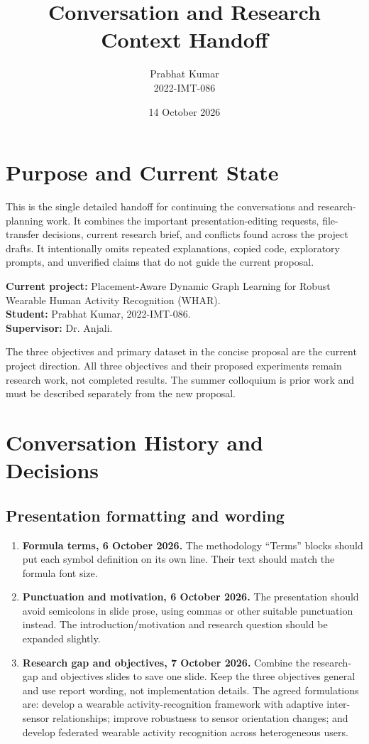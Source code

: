 \documentclass[10pt,a4paper]{article}
\title{Conversation and Research Context Handoff}
\author{Prabhat Kumar \\ 2022-IMT-086}
\date{14 October 2026}
\begin{document}
\maketitle
\tableofcontents

\section{Purpose and Current State}
This is the single detailed handoff for continuing the conversations and research-planning work. It combines the important presentation-editing requests, file-transfer decisions, current research brief, and conflicts found across the project drafts. It intentionally omits repeated explanations, copied code, exploratory prompts, and unverified claims that do not guide the current proposal.

\textbf{Current project:} Placement-Aware Dynamic Graph Learning for Robust Wearable Human Activity Recognition (WHAR).\\
\textbf{Student:} Prabhat Kumar, 2022-IMT-086.\\
\textbf{Supervisor:} Dr. Anjali.

The three objectives and primary dataset in the concise proposal are the current project direction. All three objectives and their proposed experiments remain research work, not completed results. The summer colloquium is prior work and must be described separately from the new proposal.

\section{Conversation History and Decisions}
\subsection{Presentation formatting and wording}
\begin{enumerate}[label=\textbf{Chat \arabic*.}]
\item \textbf{Formula terms, 6 October 2026.} The methodology ``Terms'' blocks should put each symbol definition on its own line. Their text should match the formula font size.
\item \textbf{Punctuation and motivation, 6 October 2026.} The presentation should avoid semicolons in slide prose, using commas or other suitable punctuation instead. The introduction/motivation and research question should be expanded slightly.
\item \textbf{Research gap and objectives, 7 October 2026.} Combine the research-gap and objectives slides to save one slide. Keep the three objectives general and use report wording, not implementation details. The agreed formulations are: develop a wearable activity-recognition framework with adaptive inter-sensor relationships; improve robustness to sensor orientation changes; and develop federated wearable activity recognition across heterogeneous users.
\end{enumerate}
\end{document}
